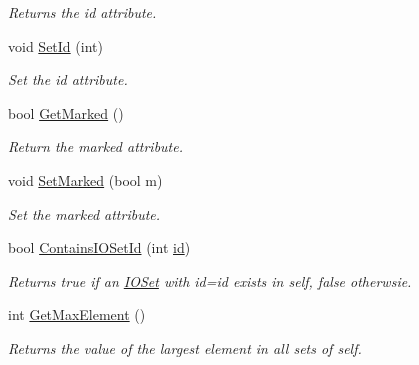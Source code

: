 \begin{DoxyCompactItemize}
\begin{DoxyCompactList}\small\item\em Returns the id attribute. \item\end{DoxyCompactList}\item 
\hypertarget{class_n_cluster_a62df66a6ed98f118dcdfebe3dc1fced5}{
void \hyperlink{class_n_cluster_a62df66a6ed98f118dcdfebe3dc1fced5}{SetId} (int)}
\label{class_n_cluster_a62df66a6ed98f118dcdfebe3dc1fced5}

\begin{DoxyCompactList}\small\item\em Set the id attribute. \item\end{DoxyCompactList}\item 
\hypertarget{class_n_cluster_a81e298f10335141a1257d29dc4c2e705}{
bool \hyperlink{class_n_cluster_a81e298f10335141a1257d29dc4c2e705}{GetMarked} ()}
\label{class_n_cluster_a81e298f10335141a1257d29dc4c2e705}

\begin{DoxyCompactList}\small\item\em Return the marked attribute. \item\end{DoxyCompactList}\item 
\hypertarget{class_n_cluster_abb8e5da62c63785a3ac9f4ab3aad207e}{
void \hyperlink{class_n_cluster_abb8e5da62c63785a3ac9f4ab3aad207e}{SetMarked} (bool m)}
\label{class_n_cluster_abb8e5da62c63785a3ac9f4ab3aad207e}

\begin{DoxyCompactList}\small\item\em Set the marked attribute. \item\end{DoxyCompactList}\item 
\hypertarget{class_n_cluster_acf1d8f02e7b8ec537225e896ae26534c}{
bool \hyperlink{class_n_cluster_acf1d8f02e7b8ec537225e896ae26534c}{ContainsIOSetId} (int \hyperlink{class_n_cluster_a9360cadd4e338b91de61f86997acc890}{id})}
\label{class_n_cluster_acf1d8f02e7b8ec537225e896ae26534c}

\begin{DoxyCompactList}\small\item\em Returns true if an \hyperlink{class_i_o_set}{IOSet} with id=id exists in self, false otherwsie. \item\end{DoxyCompactList}\item 
\hypertarget{class_n_cluster_a35ad64188494aec6b0b5a255217ba11b}{
int \hyperlink{class_n_cluster_a35ad64188494aec6b0b5a255217ba11b}{GetMaxElement} ()}
\label{class_n_cluster_a35ad64188494aec6b0b5a255217ba11b}

\begin{DoxyCompactList}\small\item\em Returns the value of the largest element in all sets of self. \item\end{DoxyCompactList}\end{DoxyCompactItemize}
